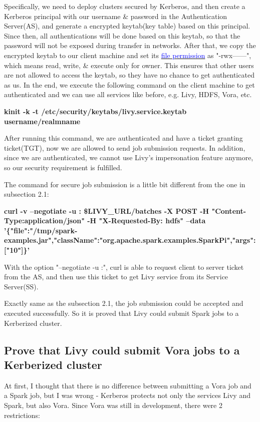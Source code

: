 \documentclass[article,colorback,accentcolor=tud4c]{tudreport}
\begin{document}
	Specifically, we need to deploy clusters secured by Kerberos, and then create a Kerberos principal with our username \& password in the Authentication Server(AS), and generate a encrypted keytab(key table) based on this principal. Since then, all authentications will be done based on this keytab, so that the password will not be exposed during transfer in networks. After that, we copy the encrypted keytab to our client machine and set its \href{https://en.wikipedia.org/wiki/File_system_permissions#Numeric_notation}{\textcolor{blue}{file permission}} as "-rwx------", which means read, write, \& execute only for owner. This ensures that other users are not allowed to access the keytab, so they have no chance to get authenticated as us. In the end, we execute the following command on the client machine to get authenticated and we can use all services like before, e.g. Livy, HDFS, Vora, etc.
	
	\noindent\textbf{kinit -k -t /etc/security/keytabs/livy.service.keytab username/realmname}
	
	After running this command, we are authenticated and have a ticket granting ticket(TGT), now we are allowed to send job submission requests. In addition, since we are authenticated, we cannot use Livy's impersonation feature anymore, so our security requirement is fulfilled.
	
	The command for secure job submission is a little bit different from the one in subsection 2.1:
	
	\noindent\textbf{curl -v --negotiate -u : \$LIVY\_URL/batches -X POST -H "Content-Type:application/json" -H "X-Requested-By: hdfs" --data '\{"file":"/tmp/spark-examples.jar","className":"org.apache.spark.examples.SparkPi","args":["10"]\}'}
	
	With the option "--negotiate -u :", curl is able to request client to server ticket from the AS, and then use this ticket to get Livy service from its Service Server(SS).
	
	Exactly same as the subsection 2.1, the job submission could be accepted and executed successfully. So it is proved that Livy could submit Spark jobs to a Kerberized cluster.
		
	\subsection{Prove that Livy could submit Vora jobs to a Kerberized cluster}
	
	At first, I thought that there is no difference between submitting a Vora job and a Spark job, but I was wrong - Kerberos protects not only the services Livy and Spark, but also Vora. Since Vora was still in development, there were 2 restrictions:
	
\end{document}
